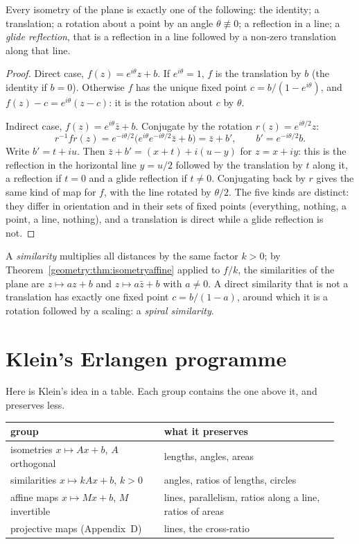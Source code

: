 \begin{theorem}\label{geometry:thm:chasles}
Every isometry of the plane is exactly one of the following: the identity; a translation; a rotation about a point by an angle
$\theta\not\equiv0$; a reflection in a line; a \emph{glide reflection}, that is a reflection in a line followed by a non-zero translation
along that line.
\end{theorem}
\begin{proof}
Direct case, $f(z)=e^{i\theta}z+b$. If $e^{i\theta}=1$, $f$ is the translation by $b$ (the identity if $b=0$). Otherwise $f$ has the unique
fixed point $c=b/(1-e^{i\theta})$, and $f(z)-c=e^{i\theta}(z-c)$: it is the rotation about $c$ by $\theta$.

Indirect case, $f(z)=e^{i\theta}\bar z+b$. Conjugate by the rotation $r(z)=e^{i\theta/2}z$:
\[
r^{-1}fr(z)=e^{-i\theta/2}\bigl(e^{i\theta}e^{-i\theta/2}\bar z+b\bigr)=\bar z+b',\qquad b'=e^{-i\theta/2}b.
\]
Write $b'=t+iu$. Then $\bar z+b'=(x+t)+i(u-y)$ for $z=x+iy$: this is the reflection in the horizontal line $y=u/2$ followed by the
translation by $t$ along it, a reflection if $t=0$ and a glide reflection if $t\ne0$. Conjugating back by $r$ gives the same kind of map
for $f$, with the line rotated by $\theta/2$. The five kinds are distinct: they differ in orientation and in their sets of fixed points
(everything, nothing, a point, a line, nothing), and a translation is direct while a glide reflection is not.
\end{proof}

A \emph{similarity} multiplies all distances by the same factor $k>0$; by Theorem~\ref{geometry:thm:isometryaffine} applied to $f/k$, the
similarities of the plane are $z\mapsto az+b$ and $z\mapsto a\bar z+b$ with $a\ne0$. A direct similarity that is not a translation has
exactly one fixed point $c=b/(1-a)$, around which it is a rotation followed by a scaling: a \emph{spiral similarity}.

\section{Klein's Erlangen programme}

Here is Klein's idea in a table. Each group contains the one above it, and preserves less.

\medskip
\begin{center}
\begin{tabular}{@{}p{0.44\linewidth}p{0.5\linewidth}@{}}
\hline
group & what it preserves\\
\hline
isometries $x\mapsto Ax+b$, $A$ orthogonal & lengths, angles, areas\\
similarities $x\mapsto kAx+b$, $k>0$ & angles, ratios of lengths, circles\\
affine maps $x\mapsto Mx+b$, $M$ invertible & lines, parallelism, ratios along a line, ratios of areas\\
projective maps (Appendix~D) & lines, the cross-ratio\\
\hline
\end{tabular}
\end{center}
\medskip

